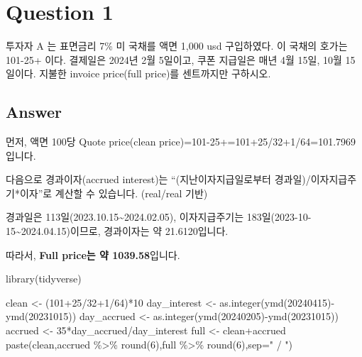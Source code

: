 \documentclass[
  a4paper,
  DIV=11,
  numbers=noendperiod]{scrreprt}
\newenvironment{Shaded}{\begin{snugshade}}{\end{snugshade}}
\newcommand{\AttributeTok}[1]{\textcolor[rgb]{0.40,0.45,0.13}{#1}}
\newcommand{\DecValTok}[1]{\textcolor[rgb]{0.68,0.00,0.00}{#1}}
\newcommand{\FunctionTok}[1]{\textcolor[rgb]{0.28,0.35,0.67}{#1}}
\newcommand{\NormalTok}[1]{\textcolor[rgb]{0.00,0.23,0.31}{#1}}
\newcommand{\OtherTok}[1]{\textcolor[rgb]{0.00,0.23,0.31}{#1}}
\newcommand{\SpecialCharTok}[1]{\textcolor[rgb]{0.37,0.37,0.37}{#1}}
\newcommand{\StringTok}[1]{\textcolor[rgb]{0.13,0.47,0.30}{#1}}
\begin{document}

\section*{Question 1}\label{question-1}


투자자 A 는 표면금리 7\% 미 국채를 액면 1,000 usd 구입하였다. 이 국채의
호가는 101-25+ 이다. 결제일은 2024년 2월 5일이고, 쿠폰 지급일은 매년 4월
15일, 10월 15일이다. 지불한 invoice price(full price)를 센트까지만
구하시오.

\subsection*{Answer}\label{answer}

먼저, 액면 100당 Quote price(clean
price)=101-25+=101+25/32+1/64=101.7969입니다.

다음으로 경과이자(accrued interest)는 ``(지난이자지급일로부터
경과일)/이자지급주기*이자''로 계산할 수 있습니다. (real/real 기반)

경과일은 113일(2023.10.15\textasciitilde2024.02.05), 이자지급주기는
183일(2023-10-15\textasciitilde2024.04.15)이므로, 경과이자는 약
21.6120입니다.

따라서, \textbf{Full price는 약 1039.58}입니다.

\begin{Shaded}
\begin{Highlighting}[]
\FunctionTok{library}\NormalTok{(tidyverse)}
\end{Highlighting}
\end{Shaded}

\begin{Shaded}
\begin{Highlighting}[]
\NormalTok{clean }\OtherTok{\textless{}{-}}\NormalTok{ (}\DecValTok{101}\SpecialCharTok{+}\DecValTok{25}\SpecialCharTok{/}\DecValTok{32}\SpecialCharTok{+}\DecValTok{1}\SpecialCharTok{/}\DecValTok{64}\NormalTok{)}\SpecialCharTok{*}\DecValTok{10}
\NormalTok{day\_interest }\OtherTok{\textless{}{-}} \FunctionTok{as.integer}\NormalTok{(}\FunctionTok{ymd}\NormalTok{(}\DecValTok{20240415}\NormalTok{)}\SpecialCharTok{{-}}\FunctionTok{ymd}\NormalTok{(}\DecValTok{20231015}\NormalTok{))}
\NormalTok{day\_accrued }\OtherTok{\textless{}{-}} \FunctionTok{as.integer}\NormalTok{(}\FunctionTok{ymd}\NormalTok{(}\DecValTok{20240205}\NormalTok{)}\SpecialCharTok{{-}}\FunctionTok{ymd}\NormalTok{(}\DecValTok{20231015}\NormalTok{))}
\NormalTok{accrued }\OtherTok{\textless{}{-}} \DecValTok{35}\SpecialCharTok{*}\NormalTok{day\_accrued}\SpecialCharTok{/}\NormalTok{day\_interest}
\NormalTok{full }\OtherTok{\textless{}{-}}\NormalTok{ clean}\SpecialCharTok{+}\NormalTok{accrued}
\FunctionTok{paste}\NormalTok{(clean,accrued }\SpecialCharTok{\%\textgreater{}\%} \FunctionTok{round}\NormalTok{(}\DecValTok{6}\NormalTok{),full }\SpecialCharTok{\%\textgreater{}\%} \FunctionTok{round}\NormalTok{(}\DecValTok{6}\NormalTok{),}\AttributeTok{sep=}\StringTok{" / "}\NormalTok{)}
\end{Highlighting}
\end{Shaded}
\end{document}
